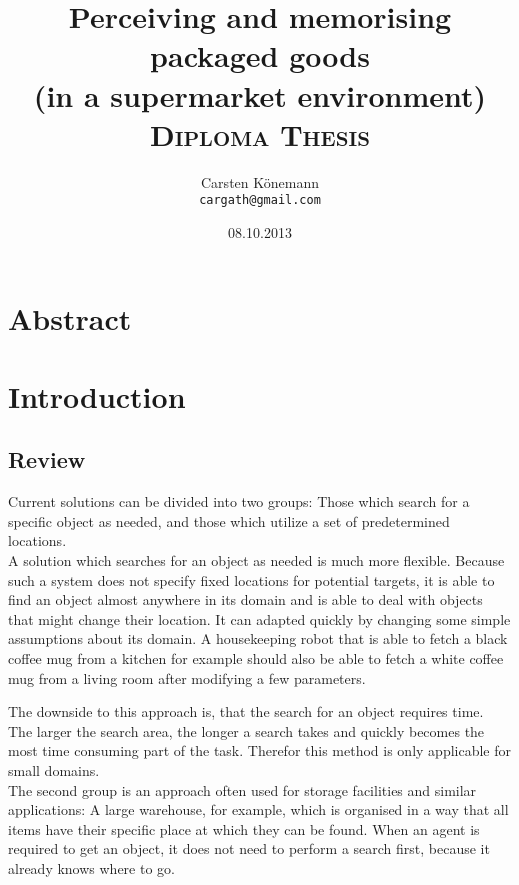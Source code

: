 \documentclass[11pt, twoside, a4paper]{report}
\begin{document}
\title{\textbf{Perceiving and memorising packaged goods} \\ (in a supermarket environment) \\ \vspace{7.5mm} \textsc{Diploma Thesis}}
\author{Carsten K\"onemann \\ \texttt{cargath@gmail.com}}
\date{08.10.2013}

\maketitle

\chapter{Abstract}

\tableofcontents

\chapter{Introduction}

\section{Review}
Current solutions can be divided into two groups: Those which search for a specific object as needed, and those which utilize a set of predetermined locations. \\

A solution which searches for an object as needed is much more flexible. Because such a system does not specify fixed locations for potential targets, it is able to find an object almost anywhere in its domain and is able to deal with objects that might change their location. It can adapted quickly by changing some simple assumptions about its domain. A housekeeping robot that is able to fetch a black coffee mug from a kitchen for example should also be able to fetch a white coffee mug from a living room after modifying a few parameters.

The downside to this approach is, that the search for an object requires time. The larger the search area, the longer a search takes and quickly becomes the most time consuming part of the task. Therefor this method is only applicable for small domains. \\

The second group is an approach often used for storage facilities and similar applications: A large warehouse, for example, which is organised in a way that all items have their specific place at which they can be found. When an agent is required to get an object, it does not need to perform a search first, because it already knows where to go.
\end{document}
